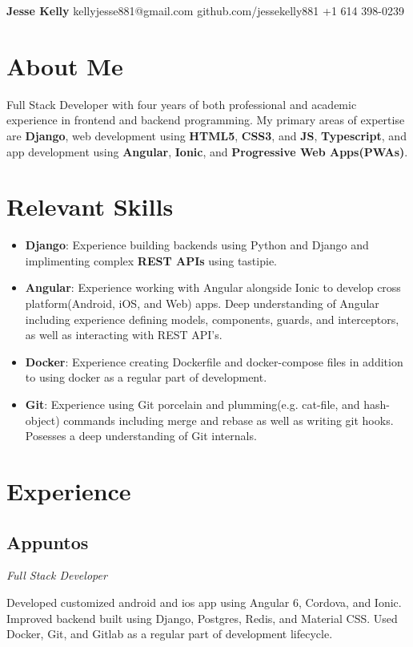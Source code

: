 \documentclass[letterpaper,11pt]{article}
\begin{document}
\begin{flushleft}
\Large{\textbf{Jesse Kelly}}
\hfill
kellyjesse881@gmail.com
\newline
github.com/jessekelly881
\hfill
+1 614 398-0239
\end{flushleft}

\section{About Me}
Full Stack Developer with four years of both
professional and academic experience in frontend
and backend programming. My primary areas of
expertise are \textbf{Django}, web development using \textbf{HTML5},
\textbf{CSS3}, and \textbf{JS}, \textbf{Typescript}, and app development using
\textbf{Angular}, \textbf{Ionic}, and \textbf{Progressive Web Apps(PWAs)}.

\section{Relevant Skills}
\begin{itemize}
\item \textbf{Django}: Experience building backends using Python and Django and implimenting complex \textbf{REST APIs} using tastipie.
\item \textbf{Angular}: Experience working with Angular alongside Ionic to develop cross platform(Android, iOS, and Web) apps. Deep understanding of Angular including experience defining models, components, guards, and interceptors, as well as interacting with REST API's.
\item \textbf{Docker}: Experience creating Dockerfile and docker-compose files in addition to using docker as a regular part of development.
\item \textbf{Git}: Experience using Git porcelain and plumming(e.g. cat-file, and hash-object) commands including merge and rebase as well as writing git hooks. Posesses a deep understanding of Git internals.
\end{itemize}

\section{Experience}
\subsection{Appuntos}
\textit{Full Stack Developer}
\vspace{2mm}
\begin{adjustwidth}{1cm}{1cm}
Developed customized android and ios
app using Angular 6, Cordova, and Ionic.
Improved backend built using Django,
Postgres, Redis, and Material CSS. Used
Docker, Git, and Gitlab as a regular part
of development lifecycle.
\end{adjustwidth}
\end{document}
